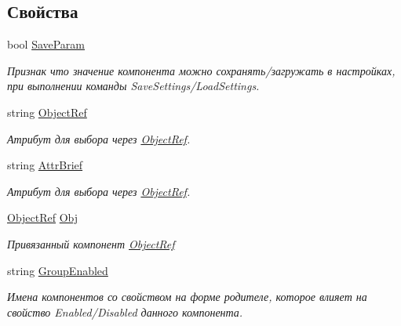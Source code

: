 \subsection*{Свойства}
\begin{DoxyCompactItemize}
\item 
bool \mbox{\hyperlink{class_f_b_a_1_1_check_box_f_b_a_ac4872db37aaa6adc6dfab522aebc2d01}{Save\+Param}}
\begin{DoxyCompactList}\small\item\em Признак что значение компонента можно сохранять/загружать в настройках, при выполнении команды Save\+Settings/\+Load\+Settings. ~\newline
\end{DoxyCompactList}\item 
string \mbox{\hyperlink{class_f_b_a_1_1_check_box_f_b_a_ad488c7115c0ce2fb70da76502f810eaf}{Object\+Ref}}
\begin{DoxyCompactList}\small\item\em Атрибут для выбора через \mbox{\hyperlink{class_f_b_a_1_1_object_ref}{Object\+Ref}}. ~\newline
\end{DoxyCompactList}\item 
string \mbox{\hyperlink{class_f_b_a_1_1_check_box_f_b_a_a60fa8d7ec56d0b053ae45dcd455aba15}{Attr\+Brief}}
\begin{DoxyCompactList}\small\item\em Атрибут для выбора через \mbox{\hyperlink{class_f_b_a_1_1_object_ref}{Object\+Ref}}. ~\newline
\end{DoxyCompactList}\item 
\mbox{\hyperlink{class_f_b_a_1_1_object_ref}{Object\+Ref}} \mbox{\hyperlink{class_f_b_a_1_1_check_box_f_b_a_ac27eb72e3b3f15cd6046e149acb4a2f5}{Obj}}
\begin{DoxyCompactList}\small\item\em Привязанный компонент \mbox{\hyperlink{class_f_b_a_1_1_object_ref}{Object\+Ref}} \end{DoxyCompactList}\item 
string \mbox{\hyperlink{class_f_b_a_1_1_check_box_f_b_a_a0f39ae777871622eeb343f4585c4bd13}{Group\+Enabled}}
\begin{DoxyCompactList}\small\item\em Имена компонентов со свойством на форме родителе, которое влияет на свойство Enabled/\+Disabled данного компонента. \end{DoxyCompactList}\end{DoxyCompactItemize}


